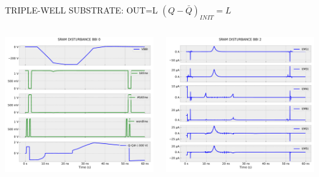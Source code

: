 
\begin{frame}{TRIPLE-WELL SUBSTRATE: OUT=L}
	\vspace{5mm}
	$(Q-\bar{Q})_{INIT}=L$
	\vspace{5mm}
	\begin{columns}
		\begin{column}{0.5\textwidth}
			\centering
			\includegraphics[width=\textwidth]{./figures/SRAMBBI0-300TW_q0.pdf}
		\end{column}
		\begin{column}{0.5\textwidth}
			\centering
			\includegraphics[width=\textwidth]{./figures/SRAMBBI2-300TW_q0.pdf}
		\end{column}
	\end{columns}
\end{frame}
